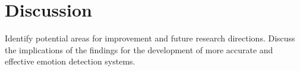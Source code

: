 \section{Discussion}
\label{sec:discussion}

Identify potential areas for improvement and future research directions.
Discuss the implications of the findings for the development of more accurate and effective emotion detection systems.
